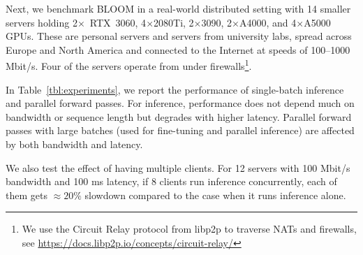 Next, we benchmark BLOOM in a real-world distributed setting with 14 smaller servers holding 2$\times$~RTX~3060, 4$\times$2080Ti, 2$\times$3090, 2$\times$A4000, and 4$\times$A5000 GPUs. These are personal servers and servers from university labs, spread across Europe and North America and connected to the Internet at speeds of 100--1000 Mbit/s. Four of the servers operate from under firewalls\footnote{We use the Circuit Relay protocol from libp2p to traverse NATs and firewalls, see \url{https://docs.libp2p.io/concepts/circuit-relay/}}.

In Table~\ref{tbl:experiments}, we report the performance of single-batch inference and parallel forward passes. For inference, performance does not depend much on bandwidth or sequence length but degrades with higher latency.
Parallel forward passes with large batches (used for fine-tuning and parallel inference) are affected by both bandwidth and latency.

We also test the effect of having multiple clients. For 12 servers with 100 Mbit/s bandwidth and 100 ms latency, if 8 clients run inference concurrently, each of them gets $\approx20\%$ slowdown compared to the case when it runs inference alone.




